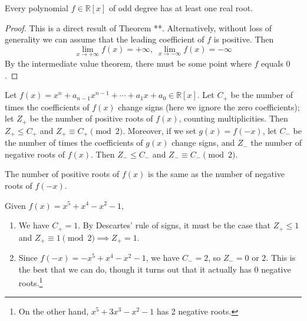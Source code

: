   \begin{corollary}
    Every polynomial $f \in \mathbb{R}[x]$ of odd degree has at least one real root. 
  \end{corollary}
  \begin{proof}
    This is a direct result of Theorem **. Alternatively, without loss of generality we can assume that the leading coefficient of $f$ is positive. Then
    \begin{equation}
      \lim_{x \rightarrow + \infty} f(x) = + \infty, \; \lim_{x \rightarrow -\infty} f(x) = -\infty
    \end{equation}
    By the intermediate value theorem, there must be some point where $f$ equals $0$. 
  \end{proof}

  \begin{theorem} 
    \label{thm:descartes}
    Let $f(x) = x^n + a_{n-1}x^{n-1} + \cdots + a_1x + a_0 \in \mathbb{R}[x]$. Let $C_+$ be the number of times the coefficients of $f(x)$ change signs (here we ignore the zero coefficients); let $Z_+$ be the number of positive roots of $f(x)$, counting multiplicities. Then $Z_+ \leq C_+$ and $Z_+ \equiv C_+ \pmod{2}$. Moreover, if we set $g(x) = f(-x)$, let $C_-$ be the number of times the coefficients of $g(x)$ change signs, and $Z_-$ the number of negative roots of $f(x)$. Then $Z_- \leq C_-$ and $Z_- \equiv C_- \pmod{2}$.
  \end{theorem}

  \begin{theorem}
    The number of positive roots of $f(x)$ is the same as the number of negative roots of $f(-x)$.
  \end{theorem}

  \begin{example}
    Given $f(x) = x^5 + x^4 - x^2 - 1$, 
    \begin{enumerate}
      \item We have $C_+ = 1$. By Descartes' rule of signs, it must be the case that $Z_+ \leq 1$ and $Z_+ \equiv 1 \pmod{2} \implies Z_+ = 1$. 
      \item Since $f(-x) = -x^5 + x^4 - x^2 - 1$, we have $C_- = 2$, so $Z_- = 0$ or $2$. This is the best that we can do, though it turns out that it actually has $0$ negative roots.\footnote{On the other hand, $x^5 + 3x^3 - x^2 - 1$ has 2 negative roots.} 
    \end{enumerate}
  \end{example}

